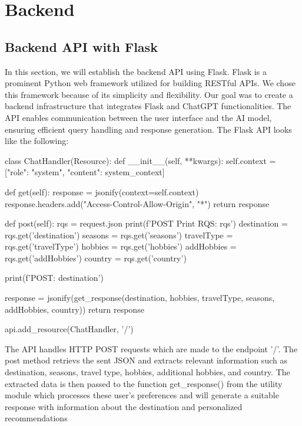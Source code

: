 \documentclass[english,notitlepage,smartquotes]{hgbreport}
\begin{document}

\section{Backend}

\subsection{Backend API with Flask}\label{Backend}
In this section, we will establish the backend API using Flask. Flask is a prominent Python web framework utilized for building RESTful APIs. We chose this framework because of its simplicity and flexibility. Our goal was to create a backend infrastructure that integrates Flask and ChatGPT functionalities. The API enables communication between the user interface and the AI model, ensuring efficient query handling and response generation. The Flask API looks like the following:
\begin{PythonCode}
	class ChatHandler(Resource):
	def __init__(self, **kwargs):
	self.context = [{"role": "system", "content": system_context}]
	
	def get(self):
	response = jsonify(context=self.context)
	response.headers.add("Access-Control-Allow-Origin", "*")
	return response
	
	def post(self):
	rqs = request.json
	print(f'POST Print RQS: {rqs}\n')
	destination = rqs.get('destination')
	seasons = rqs.get('seasons')
	travelType = rqs.get('travelType')
	hobbies = rqs.get('hobbies')
	addHobbies = rqs.get('addHobbies')
	country = rqs.get('country')
	
	print(f'POST: {destination}\n')
	
	response = jsonify(get_response(destination, hobbies, travelType, seasons, addHobbies, country))
	return response
	
	
	api.add_resource(ChatHandler, '/')
\end{PythonCode}
The API handles HTTP POST requests which are made to the endpoint '/'. The post method retrievs the sent JSON and extracts relevant information such as destination, seasons, travel type, hobbies, additional hobbies, and country. The extracted data is then passed to the function get\_response() from the utility module which processes these user's preferences and will generate a suitable response with information about the destination and personalized recommendations
\end{document}
